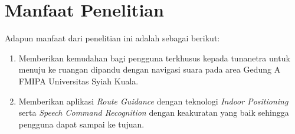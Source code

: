 \section{Manfaat Penelitian}
Adapun manfaat dari penelitian ini adalah sebagai berikut:
\begin{enumerate}
	\item Memberikan kemudahan bagi pengguna terkhusus kepada tunanetra untuk menuju ke ruangan dipandu dengan navigasi suara pada area Gedung A FMIPA Universitas Syiah Kuala.
	\item Memberikan aplikasi \textit{Route Guidance} dengan teknologi \textit{Indoor Positioning} serta \textit{Speech Command Recognition} dengan keakuratan yang baik sehingga pengguna dapat sampai ke tujuan.
\end{enumerate}


\fancyhf{} 
\fancyfoot[R]{\thepage}
\begin{comment}

\end{comment}